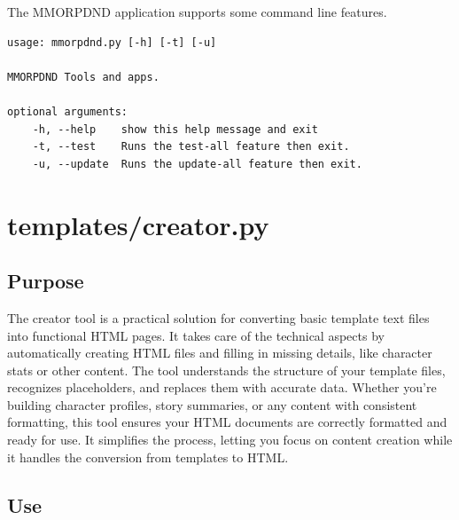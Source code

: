 The MMORPDND application supports some command line features.

\begin{lstlisting}
usage: mmorpdnd.py [-h] [-t] [-u]

MMORPDND Tools and apps.

optional arguments:
	-h, --help    show this help message and exit
	-t, --test    Runs the test-all feature then exit.
	-u, --update  Runs the update-all feature then exit.
\end{lstlisting}





























\section{templates/creator.py}



\subsection{Purpose}

The creator tool is a practical solution for converting basic template text files into functional HTML pages. It takes care of the technical aspects by automatically creating HTML files and filling in missing details, like character stats or other content. The tool understands the structure of your template files, recognizes placeholders, and replaces them with accurate data. Whether you're building character profiles, story summaries, or any content with consistent formatting, this tool ensures your HTML documents are correctly formatted and ready for use. It simplifies the process, letting you focus on content creation while it handles the conversion from templates to HTML.

\subsection{Use}

